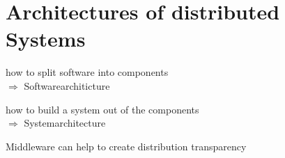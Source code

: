 \documentclass[ngerman,a4paper]{report}
\begin{document}
\chapter{Architectures of distributed Systems}

\begin{compactitem}
\item how to split software into components\\
$\Rightarrow$ Softwarearchiticture
\item how to build a system out of the components\\
$\Rightarrow$ Systemarchitecture
\end{compactitem}

Middleware can  help to create distribution transparency\\
\end{document}
